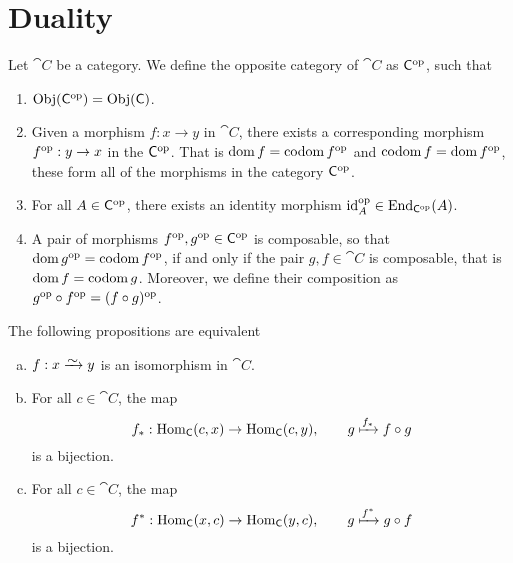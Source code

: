\section{Duality}

\begin{definition}\label{def: opposite cat}
  Let \(\cat C\) be a category. We define the opposite category of \(\cat C\) as
  \(\mathsf C^{\mathrm{op}}\), such that 
  \begin{enumerate}[(COP1)]
    \item \(\operatorname{Obj}(\mathsf C^{\mathrm{op}}) = \operatorname{Obj}(\mathsf C)\).
    \item Given a morphism \(f: x \to y\) in  \(\cat C\), there exists a
      corresponding morphism \(f^{\mathrm{op}}: y \to x\) in the \(\mathsf C^{\mathrm{op}}\). That is
      \(\operatorname{dom} f = \operatorname{codom} f^{\mathrm{op}}\) and \(\operatorname{codom} f = \operatorname{dom} f^{\mathrm{op}}\), these form all of
      the morphisms in the category \(\mathsf C^{\mathrm{op}}\).
    \item For all \(A \in \mathsf C^{\mathrm{op}}\), there exists an identity morphism
      \(\operatorname{id}_A^{\mathrm{op}} \in \operatorname{End}_{\mathsf C^{\mathrm{op}}}(A)\).
    \item A pair of morphisms \(f^{\mathrm{op}}, g^{\mathrm{op}} \in \mathsf C^{\mathrm{op}}\) is composable, so
      that \(\operatorname{dom} g^{\mathrm{op}} = \operatorname{codom} f^{\mathrm{op}}\), if and only if the pair \(g, f \in
      \cat C\) is composable, that is \(\operatorname{dom} f = \operatorname{codom} g\). Moreover, we
      define their composition as \(g^{\mathrm{op}} \circ f^{\mathrm{op}} = (f \circ g)^{\mathrm{op}}\).
  \end{enumerate}
\end{definition}

\begin{lemma}
  The following propositions are equivalent
  \begin{enumerate}[(a)]
    \item \(f : x \isoto y\) is an isomorphism in \(\cat C\).
    \item For all \(c \in \cat C\), the map
      \[
        f_*: \operatorname{Hom}_{\mathsf C}(c, x) \to \operatorname{Hom}_{\mathsf C}(c, y), \qquad
        g \xmapsto{f_*} f \circ g
      \] 
      is a bijection.
    \item For all \(c \in \cat C\), the map
      \[
         f^* : \operatorname{Hom}_{\mathsf C} (x, c) \to \operatorname{Hom}_{\mathsf C}(y, c), \qquad
         g \xmapsto{f^*} g \circ f
      \] 
      is a bijection.
  \end{enumerate}
\end{lemma}

